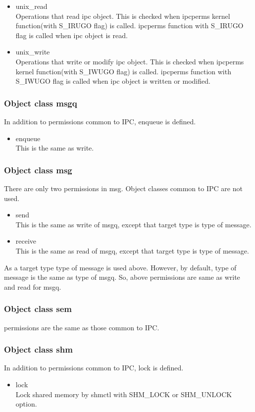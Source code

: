 \documentclass{article}
\begin{document}
\begin{itemize}
 \item unix\_read\\
       Operations that read ipc object. This is checked when ipcperms
       kernel function(with S\_IRUGO flag) is called. ipcperms function
       with S\_IRUGO flag is called when ipc object is read.       
 \item unix\_write\\
       Operations that write or modify ipc object. This is checked when
       ipcperms kernel function(with S\_IWUGO flag) is called. ipcperms function
       with S\_IWUGO flag is called when ipc object is written or modified.       
\end{itemize}

\subsubsection{Object class msgq}
In addition to permissions common to IPC, enqueue is defined.
\begin{itemize}
 \item         enqueue\\
	       This is the same as write.
\end{itemize}

\subsubsection{Object class msg}
There are only two permissions in msg. Object classes common to IPC
    are not used.
\begin{itemize}
 \item    send\\
	  This is the same as write of msgq, except that target type is
	  type of message.
 \item    receive\\
	  This is the same as read of msgq, except that target type is
	  type of message.
\end{itemize}
As a target type type of message is used above. However, by default,
type of message is the same as type of msgq. So, above permissions
are same as write and read for msgq.

\subsubsection{Object class sem}
permissions are the same as those common to IPC.

\subsubsection{Object class shm}
In addition to permissions common to IPC, lock is defined.
\begin{itemize}
 \item         lock\\
	       Lock shared memory by shmctl with SHM\_LOCK or
	       SHM\_UNLOCK option.	       
\end{itemize}
\end{document}
